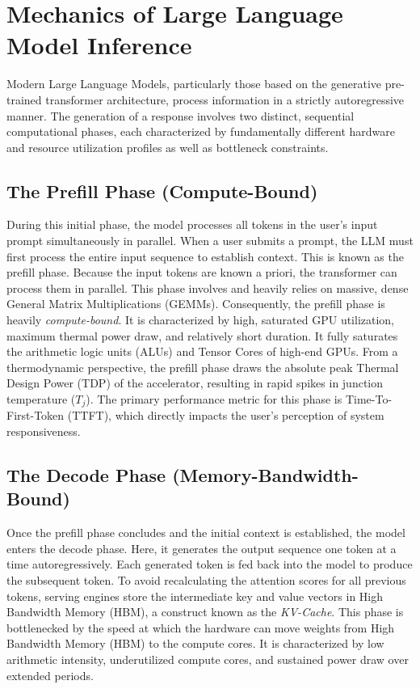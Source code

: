 \documentclass[12pt,a4paper,oneside]{report}
\begin{document}
\section{Mechanics of Large Language Model Inference}
\label{sec:lit_llm_mechanics}

Modern Large Language Models, particularly those based on the generative pre-trained transformer architecture, process information in a strictly autoregressive manner. The generation of a response involves two distinct, sequential computational phases, each characterized by fundamentally different hardware and resource utilization profiles as well as bottleneck constraints.

\subsection{The Prefill Phase (Compute-Bound)}
During this initial phase, the model processes
all tokens in the user’s input prompt simultaneously in parallel. When a user submits a prompt, the LLM must first process the entire input sequence to establish context. This is known as the prefill phase. Because the input tokens are known a priori, the transformer can process them in parallel. This phase involves and heavily relies on massive, dense General Matrix Multiplications (GEMMs).  Consequently, the prefill phase is heavily \textit{compute-bound}. It is characterized by high,
saturated GPU utilization, maximum thermal power draw, and relatively short
duration. It fully saturates the arithmetic logic units (ALUs) and Tensor Cores of high-end GPUs. From a thermodynamic perspective, the prefill phase draws the absolute peak Thermal Design Power (TDP) of the accelerator, resulting in rapid spikes in junction temperature ($T_j$). The primary performance metric for this phase is Time-To-First-Token (TTFT), which directly impacts the user's perception of system responsiveness.

\subsection{The Decode Phase (Memory-Bandwidth-Bound)}
Once the prefill phase concludes and the initial context is established, the model enters the decode phase. Here, it generates the output sequence one token at a time autoregressively. Each generated token is fed back into the model to produce the subsequent token. To avoid recalculating the attention scores for all previous tokens, serving engines store the intermediate key and value vectors in High Bandwidth Memory (HBM), a construct known as the \textit{KV-Cache}. This phase is bottlenecked by the speed at which the
hardware can move weights from High Bandwidth Memory (HBM) to the compute
cores. It is characterized by low arithmetic intensity, underutilized compute cores,
and sustained power draw over extended periods.
\end{document}

